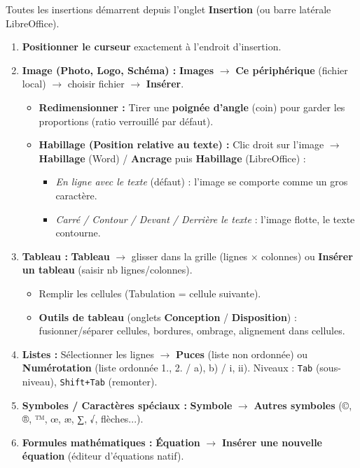 \documentclass[11pt]{article}
\begin{document}
\begin{methode}
Toutes les insertions démarrent depuis l'onglet \textbf{Insertion} (ou barre latérale LibreOffice).
\begin{enumerate}
  \item \textbf{Positionner le curseur} exactement à l'endroit d'insertion.
  \item \textbf{Image (Photo, Logo, Schéma) :} \textbf{Images} $\rightarrow$ \textbf{Ce périphérique} (fichier local) $\rightarrow$ choisir fichier $\rightarrow$ \textbf{Insérer}.
  \begin{itemize}
    \item \textbf{Redimensionner :} Tirer une \textbf{poignée d'angle} (coin) pour garder les proportions (ratio verrouillé par défaut).
    \item \textbf{Habillage (Position relative au texte) :} Clic droit sur l'image $\rightarrow$ \textbf{Habillage} (Word) / \textbf{Ancrage} puis \textbf{Habillage} (LibreOffice) :
    \begin{itemize}
      \item \emph{En ligne avec le texte} (défaut) : l'image se comporte comme un gros caractère.
      \item \emph{Carré / Contour / Devant / Derrière le texte} : l'image flotte, le texte contourne.
    \end{itemize}
  \end{itemize}
  \item \textbf{Tableau :} \textbf{Tableau} $\rightarrow$ glisser dans la grille (lignes $\times$ colonnes) ou \textbf{Insérer un tableau} (saisir nb lignes/colonnes).
  \begin{itemize}
    \item Remplir les cellules (Tabulation = cellule suivante).
    \item \textbf{Outils de tableau} (onglets \textbf{Conception} / \textbf{Disposition}) : fusionner/séparer cellules, bordures, ombrage, alignement dans cellules.
  \end{itemize}
  \item \textbf{Listes :} Sélectionner les lignes $\rightarrow$ \textbf{Puces} (liste non ordonnée) ou \textbf{Numérotation} (liste ordonnée 1., 2. / a), b) / i, ii). Niveaux : \texttt{Tab} (sous-niveau), \texttt{Shift+Tab} (remonter).
  \item \textbf{Symboles / Caractères spéciaux :} \textbf{Symbole} $\rightarrow$ \textbf{Autres symboles} (©, ®, ™, œ, æ, ∑, √, flèches...).
  \item \textbf{Formules mathématiques :} \textbf{Équation} $\rightarrow$ \textbf{Insérer une nouvelle équation} (éditeur d'équations natif).
\end{enumerate}
\end{methode}
\end{document}
